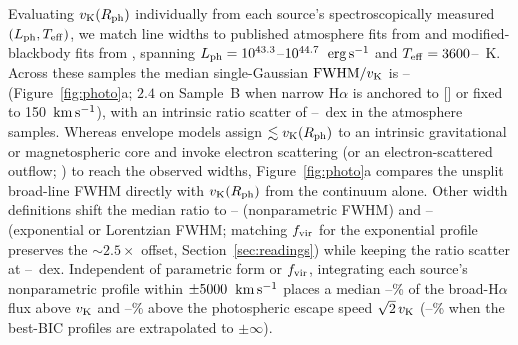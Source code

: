 \documentclass[twocolumn,linenumbers]{aastex701}
\newcommand{\Ha}{H$\alpha$}
\newcommand{\kms}{\ensuremath{{\rm km\,s^{-1}}}}
\newcommand{\ergs}{\ensuremath{{\rm erg\,s^{-1}}}}
\newcommand{\Lph}{L_{\rm ph}}
\newcommand{\Rph}{R_{\rm ph}}
\newcommand{\Teff}{T_{\rm eff}}
\newcommand{\vK}{v_{\rm K}}
\newcommand{\BX}{BX26}
\begin{document}
Evaluating $\vK(\Rph)$ individually from each source's spectroscopically measured $(\Lph,\Teff)$, we match line widths to published atmosphere fits from \citet[][\NPA{} LRDs with \BX{} widths, Sample~A; \NPB{} with our widths, Sample~B]{Curtis2026} and modified-blackbody fits from \citet[][\NPE{} LRDs with our widths, Sample~E; \NPC{} adding \NPCbx{} \BX{} widths, Sample~C; Appendix~\ref{app:scaling}]{deGraaff2026}, spanning $\Lph=10^{\LphMin{}}$--$10^{44.7{}}$~\ergs{} and $\Teff=\TminP{}$--\TmaxP{}~K.
Across these samples the median single-Gaussian ${\rm FWHM}/\vK$ is \ratLo{}--\ratHi{} (Figure~\ref{fig:photo}a; $2.4$ on Sample~B when narrow \Ha{} is anchored to [] or fixed to 150~\kms{}), with an intrinsic ratio scatter of \sqLo{}--\sqHi{}~dex in the atmosphere samples.
Whereas envelope models assign $\lesssim\vK(\Rph)$ to an intrinsic gravitational or magnetospheric core \citep{Inayoshi2026,TakasaoInayoshi2026} and invoke electron scattering (or an electron-scattered outflow; \citealt{LiuFengHo2026}) to reach the observed widths, Figure~\ref{fig:photo}a compares the unsplit broad-line FWHM directly with $\vK(\Rph)$ from the continuum alone.
Other width definitions shift the median ratio to \ratNpB{}--\ratNpE{} (nonparametric FWHM) and \ratExLo{}--\ratWingHi{} (exponential or Lorentzian FWHM; matching $f_{\rm vir}$ for the exponential profile preserves the $\sim2.5\times$ offset, Section~\ref{sec:readings}) while keeping the ratio scatter at \sqMeasLo{}--\sqMeasHi{}~dex.
Independent of parametric form or $f_{\rm vir}$, integrating each source's nonparametric profile within $\pm5000{}$~\kms{} places a median \fKepNpLo{}--\fKepNpHi{}\% of the broad-\Ha{} flux above $\vK$ and \fEscNpLo{}--\fEscNpHi{}\% above the photospheric escape speed $\sqrt{2}\,\vK$ (\fEscInfLo{}--\fEscInfHi{}\% when the best-BIC profiles are extrapolated to $\pm\infty$).
\end{document}
